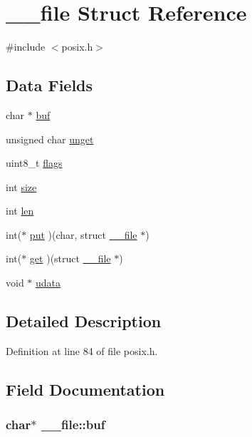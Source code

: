 \hypertarget{struct____file}{\section{\-\_\-\-\_\-file Struct Reference}
\label{struct____file}
}


{\ttfamily \#include $<$posix.\-h$>$}

\subsection*{Data Fields}
\begin{DoxyCompactItemize}
\item 
char $\ast$ \hyperlink{struct____file_a3e5a85ae919a90efbb7cb44ccb54fe46}{buf}
\item 
unsigned char \hyperlink{struct____file_a1d139ae3cb11a1fada469a49f7d3d3b6}{unget}
\item 
uint8\-\_\-t \hyperlink{struct____file_a8d11df8679502efee09740f97d7c277b}{flags}
\item 
int \hyperlink{struct____file_aff4a1ca8b6a12460812928afae81248d}{size}
\item 
int \hyperlink{struct____file_a30309efd13a75ed510bb2370debafaf8}{len}
\item 
int($\ast$ \hyperlink{struct____file_ac30baaec720d36ed503f35ae50bcec13}{put} )(char, struct \hyperlink{struct____file}{\-\_\-\-\_\-file} $\ast$)
\item 
int($\ast$ \hyperlink{struct____file_a467262b28adfee5f6fb6df42de293071}{get} )(struct \hyperlink{struct____file}{\-\_\-\-\_\-file} $\ast$)
\item 
void $\ast$ \hyperlink{struct____file_abe6f3bdb4df4119277132eb3e13a4628}{udata}
\end{DoxyCompactItemize}


\subsection{Detailed Description}


Definition at line 84 of file posix.\-h.



\subsection{Field Documentation}
\hypertarget{struct____file_a3e5a85ae919a90efbb7cb44ccb54fe46}{
\subsubsection[{buf}]{\setlength{\rightskip}{0pt plus 5cm}char$\ast$ \-\_\-\-\_\-file\-::buf}}\label{struct____file_a3e5a85ae919a90efbb7cb44ccb54fe46}


